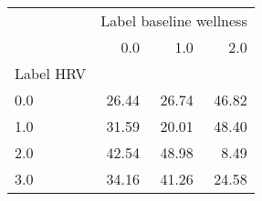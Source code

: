 \begin{tabular}{lrrr}
\toprule
{} & \multicolumn{3}{l}{Label baseline wellness} \\
{} &                     0.0 &    1.0 &    2.0 \\
Label HRV &                         &        &        \\
\midrule
0.0       &                   26.44 &  26.74 &  46.82 \\
1.0       &                   31.59 &  20.01 &  48.40 \\
2.0       &                   42.54 &  48.98 &   8.49 \\
3.0       &                   34.16 &  41.26 &  24.58 \\
\bottomrule
\end{tabular}
